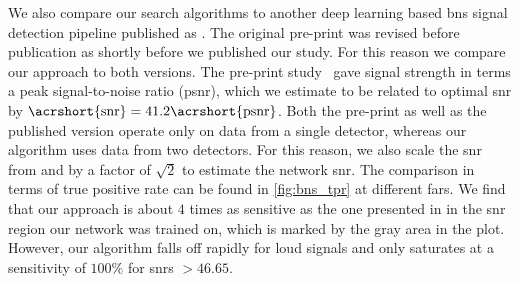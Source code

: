 We also compare our search algorithms to another deep learning based \acrshort{bns} signal detection pipeline published as \cite{Krastev:2019koe}. The original pre-print \cite{Krastev:2019aaa} was revised before publication as \cite{Krastev:2019koe} shortly before we published our study. For this reason we compare our approach to both versions. The pre-print study~\cite{Krastev:2019aaa} gave signal strength in terms a peak signal-to-noise ratio (\acrshort{psnr}), which we estimate to be related to optimal \acrshort{snr} by $\text{\acrshort{snr}}=41.2\text{\acrshort{psnr}}$. Both the pre-print as well as the published version operate only on data from a single detector, whereas our algorithm uses data from two detectors. For this reason, we also scale the \acrshort{snr} from \cite{Krastev:2019aaa} and \cite{Krastev:2019koe} by a factor of $\sqrt{2}$ to estimate the network \acrshort{snr}. The comparison in terms of true positive rate can be found in \autoref{fig:bns_tpr} at different \acrshort{far}s. We find that our approach is about $4$ times as sensitive as the one presented in \cite{Krastev:2019koe} in the \acrshort{snr} region our network was trained on, which is marked by the gray area in the plot. However, our algorithm falls off rapidly for loud signals and only saturates at a sensitivity of $100\%$ for \acrshort{snr}s $>46.65$.

